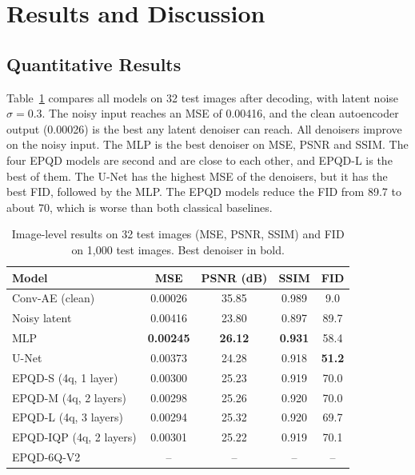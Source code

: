 \providecommand{\FloatBarrier}{\clearpage}
\section{Results and Discussion}\label{sec:results}

\subsection{Quantitative Results}
Table~\ref{tab:results} compares all models on 32 test images after decoding, with latent noise $\sigma=0.3$. The noisy input reaches an MSE of 0.00416, and the clean autoencoder output (0.00026) is the best any latent denoiser can reach. All denoisers improve on the noisy input. The MLP is the best denoiser on MSE, PSNR and SSIM. The four EPQD models are second and are close to each other, and EPQD-L is the best of them. The U-Net has the highest MSE of the denoisers, but it has the best FID, followed by the MLP. The EPQD models reduce the FID from 89.7 to about 70, which is worse than both classical baselines.

\begin{table}[t]
\centering
\caption{Image-level results on 32 test images (MSE, PSNR, SSIM) and FID on 1{,}000 test images. Best denoiser in bold.}
\label{tab:results}
\begin{tabular}{lcccc}
\toprule
\textbf{Model} & \textbf{MSE} & \textbf{PSNR (dB)} & \textbf{SSIM} & \textbf{FID}\\
\midrule
Conv-AE (clean) & 0.00026 & 35.85 & 0.989 & 9.0\\
Noisy latent & 0.00416 & 23.80 & 0.897 & 89.7\\
\midrule
MLP & \textbf{0.00245} & \textbf{26.12} & \textbf{0.931} & 58.4\\
U-Net & 0.00373 & 24.28 & 0.918 & \textbf{51.2}\\
EPQD-S (4q, 1 layer) & 0.00300 & 25.23 & 0.919 & 70.0\\
EPQD-M (4q, 2 layers) & 0.00298 & 25.26 & 0.920 & 70.0\\
EPQD-L (4q, 3 layers) & 0.00294 & 25.32 & 0.920 & 69.7\\
EPQD-IQP (4q, 2 layers) & 0.00301 & 25.22 & 0.919 & 70.1\\
EPQD-6Q-V2 & -- & -- & -- & --\\
\bottomrule
\end{tabular}
\end{table}

